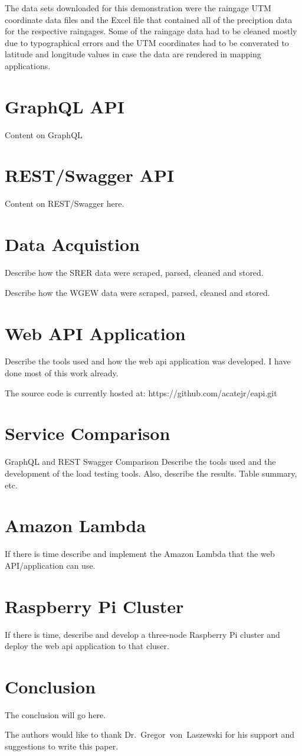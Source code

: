 The data sets downloaded for this demonstration were the raingage UTM 
coordinate data files and the Excel file that contained all of the preciption 
data for the respective raingages.  Some of the raingage data had to be cleaned 
mostly due to typographical errors and the UTM coordinates had to be 
converated to latitude and longitude values in case the data are rendered in 
mapping applications.
\section{GraphQL API}
Content on GraphQL

\section{REST/Swagger API}
Content on REST/Swagger here.

\section{Data Acquistion}
Describe how the SRER data were scraped, parsed, cleaned and stored.

Describe how the WGEW data were scraped, parsed, cleaned and stored.

\section{Web API Application}
Describe the tools used and how the web api application was developed.
I have done most of this work already.

The source code is currently hosted at: https://github.com/acatejr/eapi.git

\section{Service Comparison}
GraphQL and REST Swagger Comparison
Describe the tools used and the development of the load testing tools.  
Also, describe the results.  Table summary, etc.

\section{Amazon Lambda}
If there is time describe and implement the Amazon Lambda that the web 
API/application can use.

\section{Raspberry Pi Cluster}
If there is time, describe and develop a three-node Raspberry Pi cluster and 
deploy the web api application to that cluser.

\section{Conclusion}
The conclusion will go here.

\begin{acks}
The authors would like to thank Dr.~Gregor~von~Laszewski for his support 
and suggestions to write this paper.
\end{acks}


 
